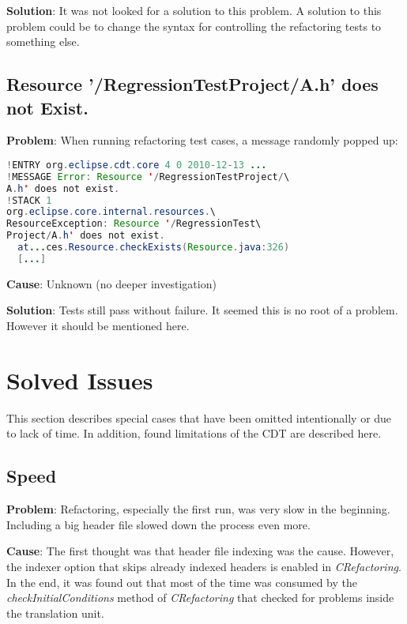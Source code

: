 \textbf{Solution}: It was not looked for a solution to this problem. A solution
to this problem could be to change the syntax for controlling the refactoring
tests to something else.

\subsection{Resource '/RegressionTestProject/A.h' does not Exist.}

\textbf{Problem}: When running refactoring test cases, a message randomly
popped up:

\begin{lstlisting}[caption={Randomly appearing error message},language=java]
!ENTRY org.eclipse.cdt.core 4 0 2010-12-13 ...
!MESSAGE Error: Resource '/RegressionTestProject/\
A.h' does not exist.
!STACK 1
org.eclipse.core.internal.resources.\
ResourceException: Resource '/RegressionTest\
Project/A.h' does not exist.
  at...ces.Resource.checkExists(Resource.java:326)
  [...]
\end{lstlisting}

\textbf{Cause}: Unknown (no deeper investigation)

\textbf{Solution}: Tests still pass without failure. It seemed this is no root
of a problem. However it should be mentioned here.

\section{Solved Issues}

This section describes special cases that have been omitted intentionally or due 
to lack of time. In addition, found limitations of the CDT are described here.

\subsection{Speed}
\textbf{Problem}: Refactoring, especially the first run, was very slow in the 
beginning. Including a big header file slowed down the process even more.

\textbf{Cause}: The first thought was that header file indexing was the cause. 
However, the indexer option that skips already indexed headers is enabled in 
\textit{CRefactoring}. In the end, it was found out that most of the time was 
consumed by the \textit{checkInitialConditions} method of \textit{CRefactoring} 
that checked for problems inside the translation unit.

